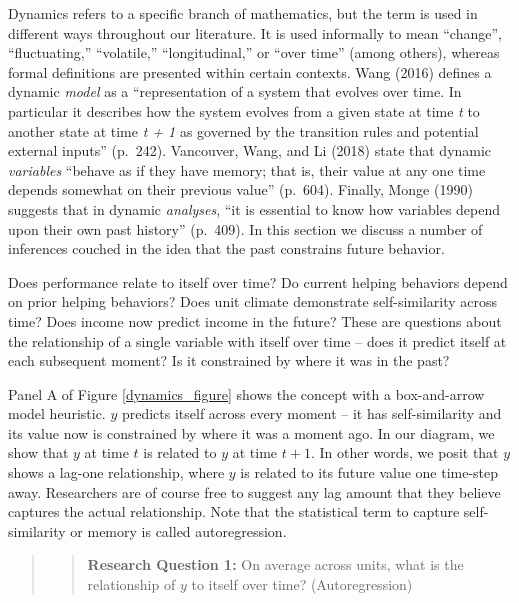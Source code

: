 \documentclass[english,,man]{apa6}
\theoremstyle{definition}
\theoremstyle{definition}
\theoremstyle{definition}
\theoremstyle{remark}
\begin{document}
Dynamics refers to a specific branch of mathematics, but the term is
used in different ways throughout our literature. It is used informally
to mean \enquote{change}, \enquote{fluctuating,} \enquote{volatile,}
\enquote{longitudinal,} or \enquote{over time} (among others), whereas
formal definitions are presented within certain contexts. Wang (2016)
defines a dynamic \emph{model} as a \enquote{representation of a system
that evolves over time. In particular it describes how the system
evolves from a given state at time \emph{t} to another state at time
\emph{t + 1} as governed by the transition rules and potential external
inputs} (p.~242). Vancouver, Wang, and Li (2018) state that dynamic
\emph{variables} \enquote{behave as if they have memory; that is, their
value at any one time depends somewhat on their previous value}
(p.~604). Finally, Monge (1990) suggests that in dynamic
\emph{analyses}, \enquote{it is essential to know how variables depend
upon their own past history} (p.~409). In this section we discuss a
number of inferences couched in the idea that the past constrains future
behavior.

Does performance relate to itself over time? Do current helping
behaviors depend on prior helping behaviors? Does unit climate
demonstrate self-similarity across time? Does income now predict income
in the future? These are questions about the relationship of a single
variable with itself over time -- does it predict itself at each
subsequent moment? Is it constrained by where it was in the past?

Panel A of Figure \ref{dynamics_figure} shows the concept with a
box-and-arrow model heuristic. \(y\) predicts itself across every moment
-- it has self-similarity and its value now is constrained by where it
was a moment ago. In our diagram, we show that \(y\) at time \(t\) is
related to \(y\) at time \(t + 1\). In other words, we posit that \(y\)
shows a lag-one relationship, where \(y\) is related to its future value
one time-step away. Researchers are of course free to suggest any lag
amount that they believe captures the actual relationship. Note that the
statistical term to capture self-similarity or memory is called
autoregression.

\begin{quote}
\begin{quote}
\textbf{Research Question 1:} On average across units, what is the
relationship of \(y\) to itself over time? (Autoregression)
\end{quote}
\end{quote}
\end{document}

